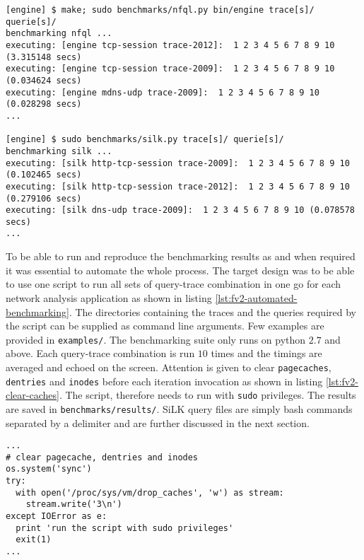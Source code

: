 \begin{lstlisting}
[engine] $ make; sudo benchmarks/nfql.py bin/engine trace[s]/ querie[s]/
benchmarking nfql ...
executing: [engine tcp-session trace-2012]:  1 2 3 4 5 6 7 8 9 10 (3.315148 secs)
executing: [engine tcp-session trace-2009]:  1 2 3 4 5 6 7 8 9 10 (0.034624 secs)
executing: [engine mdns-udp trace-2009]:  1 2 3 4 5 6 7 8 9 10 (0.028298 secs)
...

[engine] $ sudo benchmarks/silk.py trace[s]/ querie[s]/
benchmarking silk ...
executing: [silk http-tcp-session trace-2009]:  1 2 3 4 5 6 7 8 9 10 (0.102465 secs)
executing: [silk http-tcp-session trace-2012]:  1 2 3 4 5 6 7 8 9 10 (0.279106 secs)
executing: [silk dns-udp trace-2009]:  1 2 3 4 5 6 7 8 9 10 (0.078578 secs)
...
\end{lstlisting}

To be able to run and reproduce the benchmarking results as and when required
it was essential to automate the whole process. The target design was to be
able to use one script to run all sets of query-trace combination in one go
for each network analysis application as shown in listing
\ref{lst:fv2-automated-benchmarking}. The directories containing the traces
and the queries required by the script can be supplied as command line
arguments. Few examples are provided in \texttt{examples/}. The benchmarking
suite only runs on python $2.7$ and above. Each query-trace combination is run
$10$ times and the timings are averaged and echoed on the screen. Attention is
given to clear \texttt{pagecaches}, \texttt{dentries} and \texttt{inodes}
before each iteration invocation as shown in listing
\ref{lst:fv2-clear-caches}. The script, therefore needs to run with
\texttt{sudo} privileges. The results are saved in
\texttt{benchmarks/results/}. SiLK query files are simply bash commands
separated by a delimiter and are further discussed in the next section.

\begin{lstlisting}
...
# clear pagecache, dentries and inodes
os.system('sync')
try:
  with open('/proc/sys/vm/drop_caches', 'w') as stream:
    stream.write('3\n')
except IOError as e:
  print 'run the script with sudo privileges'
  exit(1)
...
\end{lstlisting}
